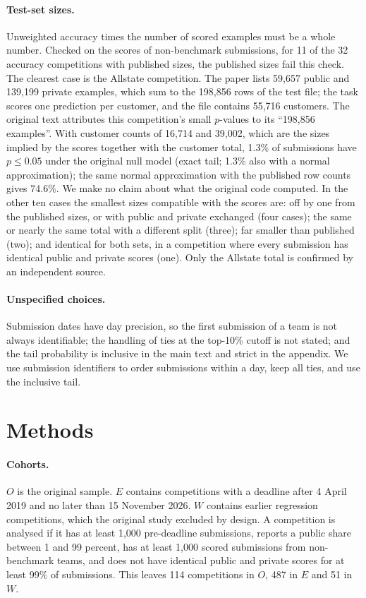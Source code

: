 \documentclass[10pt]{article}
\begin{document}
\paragraph{Test-set sizes.} Unweighted accuracy times the number of scored examples must be a whole number. Checked on the scores of non-benchmark submissions, for 11 of the 32 accuracy competitions with published sizes, the published sizes fail this check. The clearest case is the Allstate competition. The paper lists 59,657 public and 139,199 private examples, which sum to the 198,856 rows of the test file; the task scores one prediction per customer, and the file contains 55,716 customers. The original text attributes this competition's small $p$-values to its ``198,856 examples''. With customer counts of 16,714 and 39,002, which are the sizes implied by the scores together with the customer total, 1.3\% of submissions have $p \le 0.05$ under the original null model (exact tail; 1.3\% also with a normal approximation); the same normal approximation with the published row counts gives 74.6\%. We make no claim about what the original code computed. In the other ten cases the smallest sizes compatible with the scores are: off by one from the published sizes, or with public and private exchanged (four cases); the same or nearly the same total with a different split (three); far smaller than published (two); and identical for both sets, in a competition where every submission has identical public and private scores (one). Only the Allstate total is confirmed by an independent source.

\paragraph{Unspecified choices.} Submission dates have day precision, so the first submission of a team is not always identifiable; the handling of ties at the top-10\% cutoff is not stated; and the tail probability is inclusive in the main text and strict in the appendix. We use submission identifiers to order submissions within a day, keep all ties, and use the inclusive tail.

\section{Methods}
\label{sec:methods}

\paragraph{Cohorts.} $O$ is the original sample. $E$ contains competitions with a deadline after 4 April 2019 and no later than 15 November 2026. $W$ contains earlier regression competitions, which the original study excluded by design. A competition is analysed if it has at least 1,000 pre-deadline submissions, reports a public share between 1 and 99 percent, has at least 1,000 scored submissions from non-benchmark teams, and does not have identical public and private scores for at least 99\% of submissions. This leaves 114 competitions in $O$, 487 in $E$ and 51 in $W$.
\end{document}
